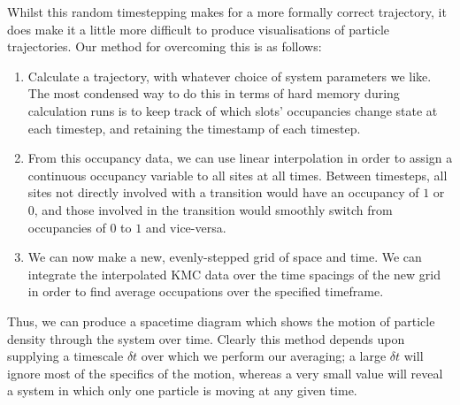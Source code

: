Whilst this random timestepping makes for a more formally correct trajectory, it does make it a
little more difficult to produce visualisations of particle trajectories. Our method for overcoming
this is as follows:
\begin{enumerate}
 \item Calculate a trajectory, with whatever choice of system parameters we like. The most 
 condensed way to do this in terms of hard memory during calculation runs is to keep track of which
 slots' occupancies change state at each 
 timestep, and retaining the timestamp of each timestep.
 \item From this occupancy data, we can use linear interpolation in order to assign a continuous
 occupancy variable to all sites at all times. Between timesteps, all sites not directly involved
 with a transition would have an occupancy of $1$ or $0$, and those involved in the transition
 would smoothly switch from occupancies of $0$ to $1$ and vice-versa.
 \item We can now make a new, evenly-stepped grid of space and time.
 We can integrate the interpolated KMC data over the time spacings of the new grid in order to
 find average occupations over the specified timeframe. 
\end{enumerate}
Thus, we can produce a spacetime diagram which shows the motion of particle density through the 
system over time. Clearly this method depends upon supplying a timescale $\delta t$ over which we
perform our averaging; a large $\delta t$ will ignore most of the specifics of the motion, whereas
a very small value will reveal a system in which only one particle is moving at any given time.

